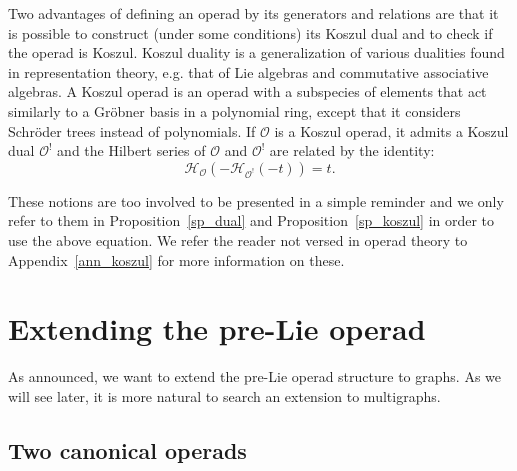 \documentclass[11pt]{article}
\theoremstyle{definition}
\numberwithin{equation}{section}
\newcommand{\hilbert}[1]{\mathcal{H}_{#1}}
\newcommand{\Operad}{\mathcal{O}}
\begin{document}
Two advantages of defining an operad by its generators and relations are that it is possible to construct 
(under some conditions) its Koszul dual and to check if the operad is Koszul. 
Koszul duality is a generalization of various dualities found in representation theory, e.g. that
of Lie algebras and commutative associative algebras. A Koszul operad is an operad with a 
subspecies of elements that act similarly to a Gröbner basis in a polynomial ring, except that it considers
Schröder trees instead of polynomials.
If $\Operad$ is a Koszul operad, it admits a Koszul dual $\Operad^!$ and the Hilbert series of $\Operad$ and $\Operad^!$ 
are related by the identity:
\begin{equation}
    \hilbert{\Operad}(-\hilbert{\Operad^!}(-t)) = t.
\end{equation}

These notions are too involved to be presented in a simple reminder and we only refer to them in 
Proposition~\ref{sp_dual} and Proposition~\ref{sp_koszul} in order to use the above equation. We refer the reader 
not versed in operad theory to Appendix~\ref{ann_koszul} for more information on these. 








\section{Extending the pre-Lie operad}\label{sec_extending_plie}
As announced, we want to extend the pre-Lie operad structure to graphs. As we will see later, it is more
natural to search an extension to multigraphs.




\subsection{Two canonical operads}\label{subsec_cano_op}
\end{document}
